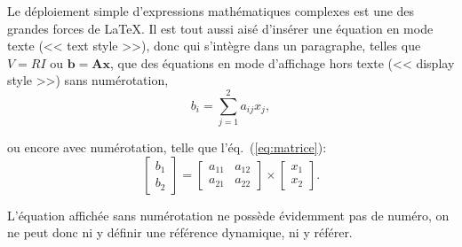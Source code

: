\documentclass[french]{article}
\begin{document}
	
Le déploiement simple d'expressions mathématiques complexes est une des grandes forces de \LaTeX. Il est tout aussi aisé d'insérer une équation en mode texte (<< text style >>), donc qui s'intègre dans un paragraphe, telles que $V=RI$ ou $\mathbf{b} = \mathbf{A} \mathbf{x}$, que des équations en mode d'affichage hors texte (<< display style >>) sans numérotation,
\begin{displaymath}
   b_i = \sum_{j=1}^{2} a_{ij} x_{j},
\end{displaymath}

ou encore avec numérotation, telle que l'éq.~(\ref{eq:matrice}):
\begin{equation}
   \left[ \begin{array}{c} b_{1} \\ b_{2} \end{array} \right]
      = \left[ \begin{array}{cc} a_{11} & a_{12} \\ a_{21} & a_{22} \end{array} \right]
        \times
        \left[ \begin{array}{c} x_{1} \\ x_{2} \end{array} \right].
   \label{eq:matrice}
\end{equation}

L'équation affichée sans numérotation ne possède évidemment pas de numéro, on ne peut donc ni y définir une référence dynamique, ni y référer.
\end{document}
